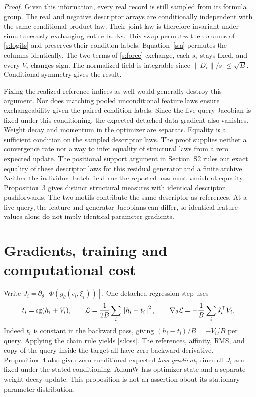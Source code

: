 \noindent\emph{Proof.}
Given this information, every real record is still sampled from its formula group. The real and negative descriptor arrays are conditionally independent with the same conditional product law. Their joint law is therefore invariant under simultaneously exchanging entire banks. This swap permutes the columns of \eqref{s:logits} and preserves their condition labels. Equation~\eqref{s:a} permutes the columns identically. The two terms of \eqref{s:force} exchange, each $s_\tau$ stays fixed, and every $V_i$ changes sign. The normalized field is integrable since $\|D_i^\tau\|/s_\tau\le\sqrt B$. Conditional symmetry gives the result. \proofend

Fixing the realized reference indices as well would generally destroy this argument. Nor does matching pooled unconditional feature laws ensure exchangeability given the paired condition labels. Since the live query Jacobian is fixed under this conditioning, the expected detached data gradient also vanishes. Weight decay and momentum in the optimizer are separate. Equality is a sufficient condition on the sampled descriptor laws. The proof supplies neither a convergence rate nor a way to infer equality of structural laws from a zero expected update. The positional support argument in Section~S2 rules out exact equality of these descriptor laws for this residual generator and a finite archive. Neither the individual batch field nor the reported loss must vanish at equality. Proposition~3 gives distinct structural measures with identical descriptor pushforwards. The two motifs contribute the same descriptor as references. At a live query, the feature and generator Jacobians can differ, so identical feature values alone do not imply identical parameter gradients.

\newpage
\section{Gradients, training and computational cost}
Write $J_i=\partial_\theta[\Phi(g_\theta(c_i,\xi_i))]$. One detached regression step uses
\begin{equation}
 t_i=\operatorname{sg}(h_i+V_i),\qquad
 \mathcal L=\frac1{2B}\sum_i\left\lVert h_i-t_i\right\rVert^2,\qquad
 \nabla_\theta\mathcal L=-\frac1B\sum_i J_i^\top V_i .
 \label{s:loss}
\end{equation}
Indeed $t_i$ is constant in the backward pass, giving $(h_i-t_i)/B=-V_i/B$ per query. Applying the chain rule yields \eqref{s:loss}. The references, affinity, RMS, and copy of the query inside the target all have zero backward derivative. Proposition~4 also gives zero conditional expected \emph{loss gradient}, since all $J_i$ are fixed under the stated conditioning. AdamW has optimizer state and a separate weight-decay update. This proposition is not an assertion about its stationary parameter distribution.


